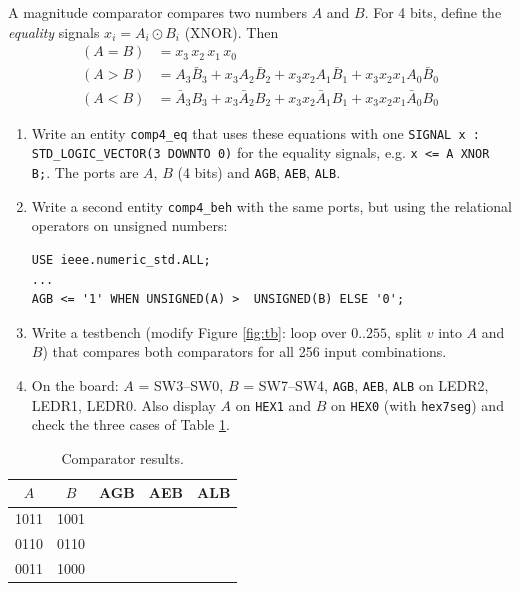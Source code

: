 \documentclass{article}
\begin{document}
A magnitude comparator compares two numbers $A$ and $B$. For 4 bits, define the \emph{equality} signals $x_i = A_i \odot B_i$ (XNOR). Then
\begin{align*}
(A = B) &= x_3\,x_2\,x_1\,x_0 \\
(A > B) &= A_3\bar{B}_3 + x_3 A_2\bar{B}_2 + x_3x_2A_1\bar{B}_1 + x_3x_2x_1A_0\bar{B}_0 \\
(A < B) &= \bar{A}_3 B_3 + x_3 \bar{A}_2 B_2 + x_3x_2\bar{A}_1 B_1 + x_3x_2x_1\bar{A}_0 B_0
\end{align*}

\begin{enumerate}
    \item Write an entity \texttt{comp4\_eq} that uses these equations with one \texttt{SIGNAL x : STD\_LOGIC\_VECTOR(3 DOWNTO 0)} for the equality signals, e.g. \texttt{x <= A XNOR B;}. The ports are $A$, $B$ (4 bits) and \texttt{AGB}, \texttt{AEB}, \texttt{ALB}.
    \item Write a second entity \texttt{comp4\_beh} with the same ports, but using the relational operators on unsigned numbers:
\begin{verbatim}
USE ieee.numeric_std.ALL;
...
AGB <= '1' WHEN UNSIGNED(A) >  UNSIGNED(B) ELSE '0';
\end{verbatim}
    \item Write a testbench (modify Figure \ref{fig:tb}: loop over $0..255$, split $v$ into $A$ and $B$) that compares both comparators for all 256 input combinations.
    \item On the board: $A$ = SW3--SW0, $B$ = SW7--SW4, \texttt{AGB}, \texttt{AEB}, \texttt{ALB} on LEDR2, LEDR1, LEDR0. Also display $A$ on \texttt{HEX1} and $B$ on \texttt{HEX0} (with \texttt{hex7seg}) and check the three cases of Table \ref{tab:comp}.
\end{enumerate}

\begin{table}[H]
    \centering
    \begin{tabular}{|c|c|c|c|c|}
        \hline
        $A$ & $B$ & AGB & AEB & ALB \\
        \hline
        1011 & 1001 & & & \\ \hline
        0110 & 0110 & & & \\ \hline
        0011 & 1000 & & & \\ \hline
    \end{tabular}
    \caption{Comparator results.}
    \label{tab:comp}
\end{table}
\end{document}
